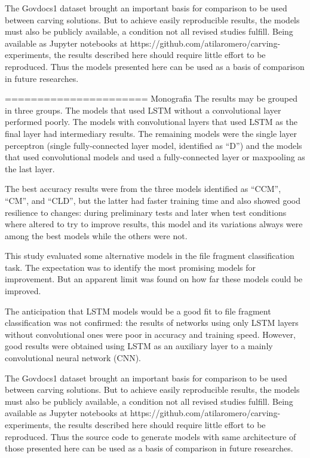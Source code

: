 The Govdocs1 dataset brought an important basis for comparison to be used between carving solutions. But to achieve easily reproducible results, the models must also be publicly available, a condition not all revised studies fulfill. Being available as Jupyter notebooks at https://github.com/atilaromero/carving-experiments, the results described here should require little effort to be reproduced. Thus the models presented here can be used as a basis of comparison in  future researches.


======================
Monografia
The results may be grouped in three groups. The models that used LSTM without a convolutional layer performed poorly. The models with convolutional layers that used LSTM as the final layer had intermediary results. The remaining models were the single layer perceptron (single fully-connected layer model, identified as ``D'') and the models that used convolutional models and used a fully-connected layer or maxpooling as the last layer.

The best accuracy results were from the three models identified as ``CCM'', ``CM'', and ``CLD'', but the latter had faster training time and also showed good resilience to changes: during preliminary tests and later when test conditions where altered to try to improve results, this model and its variations always were among the best models while the others were not.

This study evaluated some alternative models in the file fragment classification task. The expectation was to identify the most promising models for improvement. But an apparent limit was found on how far these models could be improved. 

The anticipation that LSTM models would be a good fit to file fragment classification was not confirmed: the results of networks using only LSTM layers without convolutional ones were poor in accuracy and training speed. However, good results were obtained using LSTM as an auxiliary layer to a mainly convolutional neural network (CNN). 

The Govdocs1 dataset brought an important basis for comparison to be used between carving solutions. But to achieve easily reproducible results, the models must also be publicly available, a condition not all revised studies fulfill. Being available as Jupyter notebooks at https://github.com/atilaromero/carving-experiments, the results described here should require little effort to be reproduced. Thus the source code to generate models with same architecture of those presented here can be used as a basis of comparison in future researches.

